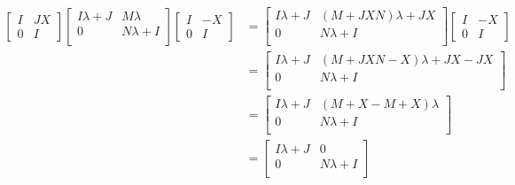 \documentclass{article}
\newcommand{\0}{\mathbf{0}}
\begin{document}
\begin{align*}
    \begin{bmatrix}I&JX\\0&I\end{bmatrix}\begin{bmatrix}I\lambda+J&M\lambda\\0&N\lambda+I\\\end{bmatrix}\begin{bmatrix}I&-X\\0&I\end{bmatrix}
    &=\begin{bmatrix}I\lambda+J&(M+JXN)\lambda+JX\\0&N\lambda+I\\\end{bmatrix}\begin{bmatrix}I&-X\\0&I\end{bmatrix}\\
    &=\begin{bmatrix}I\lambda+J&(M+JXN-X)\lambda+JX-JX\\0&N\lambda+I\\\end{bmatrix}\\
    &=\begin{bmatrix}I\lambda+J&(M+X-M+X)\lambda\\0&N\lambda+I\\\end{bmatrix}\\
    &=\begin{bmatrix}I\lambda+J&0\\0&N\lambda+I\\\end{bmatrix}\\
\end{align*}
\end{document}
